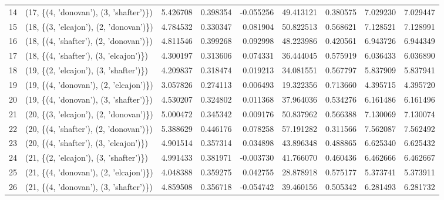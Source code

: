 \begin{tabular}{llrrrrrrr}
14 &  (17, \{(4, 'donovan'), (3, 'shafter')\}) &  5.426708 &   0.398354 & -0.055256 &  49.413121 &  0.380575 &   7.029230 &  7.029447 \\
15 &  (18, \{(3, 'elcajon'), (2, 'donovan')\}) &  4.784532 &   0.330347 &  0.081904 &  50.822513 &  0.568621 &   7.128521 &  7.128991 \\
16 &  (18, \{(4, 'shafter'), (2, 'donovan')\}) &  4.811546 &   0.399268 &  0.092998 &  48.223986 &  0.420561 &   6.943726 &  6.944349 \\
17 &  (18, \{(4, 'shafter'), (3, 'elcajon')\}) &  4.300197 &   0.313606 &  0.074331 &  36.444045 &  0.575919 &   6.036433 &  6.036890 \\
18 &  (19, \{(2, 'elcajon'), (3, 'shafter')\}) &  4.209837 &   0.318474 &  0.019213 &  34.081551 &  0.567797 &   5.837909 &  5.837941 \\
19 &  (19, \{(4, 'donovan'), (2, 'elcajon')\}) &  3.057826 &   0.274113 &  0.006493 &  19.322356 &  0.713660 &   4.395715 &  4.395720 \\
20 &  (19, \{(4, 'donovan'), (3, 'shafter')\}) &  4.530207 &   0.324802 &  0.011368 &  37.964036 &  0.534276 &   6.161486 &  6.161496 \\
21 &  (20, \{(3, 'elcajon'), (2, 'donovan')\}) &  5.000472 &   0.345342 &  0.009176 &  50.837962 &  0.566388 &   7.130069 &  7.130074 \\
22 &  (20, \{(4, 'shafter'), (2, 'donovan')\}) &  5.388629 &   0.446176 &  0.078258 &  57.191282 &  0.311566 &   7.562087 &  7.562492 \\
23 &  (20, \{(4, 'shafter'), (3, 'elcajon')\}) &  4.901514 &   0.357314 &  0.034898 &  43.896348 &  0.488865 &   6.625340 &  6.625432 \\
24 &  (21, \{(2, 'elcajon'), (3, 'shafter')\}) &  4.991433 &   0.381971 & -0.003730 &  41.766070 &  0.460436 &   6.462666 &  6.462667 \\
25 &  (21, \{(4, 'donovan'), (2, 'elcajon')\}) &  4.048388 &   0.359275 &  0.042755 &  28.878918 &  0.575177 &   5.373741 &  5.373911 \\
26 &  (21, \{(4, 'donovan'), (3, 'shafter')\}) &  4.859508 &   0.356718 & -0.054742 &  39.460156 &  0.505342 &   6.281493 &  6.281732 \\
\bottomrule
\end{tabular}
